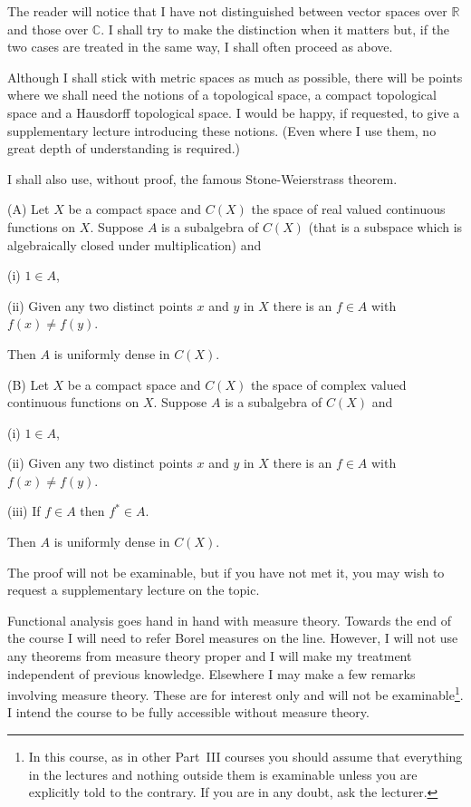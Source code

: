 The reader will notice that I have not distinguished
between vector spaces over ${\mathbb R}$ and those over ${\mathbb C}$.
I shall try to make the distinction when it matters but,
if the two cases are treated in the same way, I shall
often proceed as above.

Although I shall stick with metric spaces as much
as possible, there will be points where we shall need
the notions of a topological space, a compact
topological space and a Hausdorff topological space.
I would be happy, if requested, to give a supplementary
lecture introducing these notions. (Even where I use them,
no great depth of understanding is required.)

I shall also use, without proof, the famous
Stone-Weierstrass theorem.
\begin{theorem} (A) Let $X$ be a compact space and
$C(X)$ the space of real valued continuous functions
on $X$. Suppose $A$ is a subalgebra of $C(X)$ (that is a
subspace which is algebraically closed under multiplication)
and

(i) $1\in A$, 

(ii) Given any two distinct points $x$ and $y$
in $X$ there is an $f\in A$ with $f(x)\neq f(y)$.

Then $A$ is uniformly dense in $C(X)$.

(B) Let $X$ be a compact space and
$C(X)$ the space of complex valued continuous functions
on $X$. Suppose $A$ is a subalgebra of $C(X)$
and

(i) $1\in A$, 

(ii) Given any two distinct points $x$ and $y$
in $X$ there is an $f\in A$ with $f(x)\neq f(y)$.

(iii) If $f\in A$ then $f^{*}\in A$.

Then $A$ is uniformly dense in $C(X)$.
\end{theorem}

The proof will not be examinable, but if you have not
met it, you may wish to request a supplementary lecture
on the topic.

Functional analysis goes hand in hand with measure theory.
Towards the end of the course I will need to refer
Borel measures on the line. However, I will not
use any theorems from measure theory proper
and I will make my treatment independent of previous knowledge.
Elsewhere I may make a few remarks involving measure
theory. These are for interest only and will not be 
examinable\footnote{In this course, as in other Part~III
courses you should assume that everything in the
lectures and nothing outside them is examinable
unless you are explicitly told to the contrary. If you
are in any doubt, ask the lecturer.}. I intend the course
to be fully accessible without measure theory.
